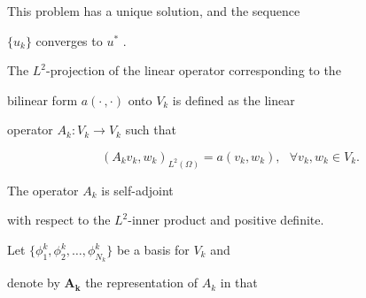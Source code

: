 \documentclass[smallcondensed,final]{svjour3}     %
\begin{document}
This problem has a unique solution, and the sequence

$\{u_k\}$ converges to $u^*$ \cite{BrennerScott94}.

%


The $L^2$-projection of the linear operator corresponding to the

bilinear form $a(\cdot\,,\cdot)$ onto $V_k$ is defined as the linear

operator $A_k : V_{k} \rightarrow V_{k}$ such that

\begin{equation}

\label{eqn:fematDef}

(A_{k} v_k,w_k)_{L^2(\Omega)} = a(v_k,w_k),  \ \ \ \forall v_k,w_k \in V_k.

\end{equation}











The operator $A_k$ is self-adjoint

with respect to the $L^2$-inner product and positive definite.




Let $\{\phi_1^k,\phi_2^k,\ldots,\phi_{N_k}^k\}$ be a basis for $V_k$ and

denote by $\mathbf{A_k}$ the representation of $A_k$ in that
\end{document}
